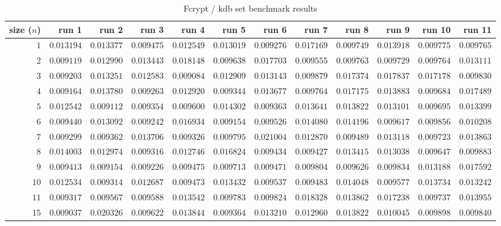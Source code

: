  
\begin{sidewaystable} \centering \caption{Fcrypt / kdb set benchmark results} \label{eval-table-fcrypt-set} \scriptsize \begin{tabular}{r|rrrrrrrrrrr} size ($n$) & run 1 & run 2 & run 3 & run 4 & run 5 & run 6 & run 7 & run 8 & run 9 & run 10 & run 11\\ \hline
$1$ & $0.013194$ & $0.013377$ & $0.009475$ & $0.012549$ & $0.013019$ & $0.009276$ & $0.017169$ & $0.009749$ & $0.013918$ & $0.009775$ & $0.009765$ \\
$2$ & $0.009119$ & $0.012990$ & $0.013443$ & $0.018148$ & $0.009638$ & $0.017703$ & $0.009555$ & $0.009763$ & $0.009729$ & $0.009764$ & $0.013111$ \\
$3$ & $0.009203$ & $0.013251$ & $0.012583$ & $0.009084$ & $0.012909$ & $0.013143$ & $0.009879$ & $0.017374$ & $0.017837$ & $0.017178$ & $0.009830$ \\
$4$ & $0.009164$ & $0.013780$ & $0.009263$ & $0.012920$ & $0.009344$ & $0.013677$ & $0.009764$ & $0.017175$ & $0.013883$ & $0.009684$ & $0.017489$ \\
$5$ & $0.012542$ & $0.009112$ & $0.009354$ & $0.009600$ & $0.014302$ & $0.009363$ & $0.013641$ & $0.013822$ & $0.013101$ & $0.009695$ & $0.013399$ \\
$6$ & $0.009440$ & $0.013092$ & $0.009242$ & $0.016934$ & $0.009154$ & $0.009526$ & $0.014080$ & $0.014196$ & $0.009617$ & $0.009856$ & $0.010208$ \\
$7$ & $0.009299$ & $0.009362$ & $0.013706$ & $0.009326$ & $0.009795$ & $0.021004$ & $0.012870$ & $0.009489$ & $0.013118$ & $0.009723$ & $0.013863$ \\
$8$ & $0.014003$ & $0.012974$ & $0.009316$ & $0.012746$ & $0.016824$ & $0.009434$ & $0.009427$ & $0.013415$ & $0.013038$ & $0.009647$ & $0.009883$ \\
$9$ & $0.009413$ & $0.009154$ & $0.009226$ & $0.009475$ & $0.009713$ & $0.009471$ & $0.009804$ & $0.009626$ & $0.009834$ & $0.013188$ & $0.017592$ \\
$10$ & $0.012534$ & $0.009314$ & $0.012687$ & $0.009473$ & $0.013432$ & $0.009537$ & $0.009483$ & $0.014048$ & $0.009577$ & $0.013734$ & $0.013242$ \\
$11$ & $0.009317$ & $0.009567$ & $0.009588$ & $0.013542$ & $0.009783$ & $0.009824$ & $0.018328$ & $0.013862$ & $0.017238$ & $0.009737$ & $0.013955$ \\
$15$ & $0.009037$ & $0.020326$ & $0.009622$ & $0.013844$ & $0.009364$ & $0.013210$ & $0.012960$ & $0.013822$ & $0.010045$ & $0.009898$ & $0.009840$ \\

\end{tabular}
\end{sidewaystable}
